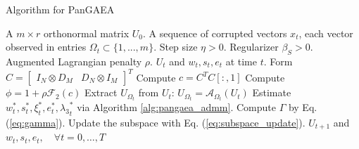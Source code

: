 \documentclass[10pt,twocolumn,letterpaper]{article}
\begin{document}
\begin{algorithm}
 \caption{Algorithm for PanGAEA}
 \begin{algorithmic}[1]
 \renewcommand{\algorithmicrequire}{\textbf{Input:}}
 \renewcommand{\algorithmicensure}{\textbf{Output:}}
 \REQUIRE A $m \times r$ orthonormal matrix $U_0$. A sequence of corrupted vectors $x_t$, each vector observed in entries $\Omega_t \subset \{1, . . . , m\}$. Step size $\eta > 0$. Regularizer $\beta_S > 0$. Augmented Lagrangian penalty $\rho$.
 \ENSURE  $U_t$ and $w_t, s_t, e_t$ at time $t$.
 \STATE Form $C = \begin{bmatrix} I_N \otimes D_M & D_N \otimes I_M  \end{bmatrix}^T$
 \STATE Compute $c = C^TC[:,1]$
 \STATE Compute $\phi = 1 + \rho \mathcal{F}_2(c)$
  \STATE Extract $U_{\Omega_t}$ from $U_t$: $U_{\Omega_t} = \mathcal{A}_{\Omega_t}(U_t)$
  \STATE Estimate $w_t^*,s_t^*, \xi_t^*,e_t^*,{\lambda_3}_t^*$ via Algorithm \ref{alg:pangaea_admm}.
  \STATE Compute $\Gamma$ by Eq. (\ref{eq:gamma}).
\STATE Update the subspace with Eq. (\ref{eq:subspace_update}).
  \ENDFOR
 \RETURN $U_{t+1}$ and $w_t, s_t, e_t, \quad \forall t = 0, \ldots, T$
 \end{algorithmic} 
 \label{alg:pangaea}
 \end{algorithm}
 
\end{document}
